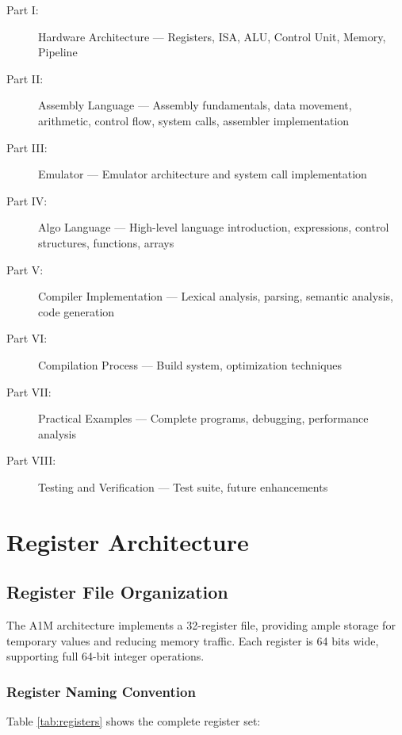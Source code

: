 \documentclass[12pt,a4paper,oneside]{book}
\begin{document}
\begin{description}
    \item[Part I:] Hardware Architecture --- Registers, ISA, ALU, Control Unit, Memory, Pipeline
    \item[Part II:] Assembly Language --- Assembly fundamentals, data movement, arithmetic, control flow, system calls, assembler implementation
    \item[Part III:] Emulator --- Emulator architecture and system call implementation
    \item[Part IV:] Algo Language --- High-level language introduction, expressions, control structures, functions, arrays
    \item[Part V:] Compiler Implementation --- Lexical analysis, parsing, semantic analysis, code generation
    \item[Part VI:] Compilation Process --- Build system, optimization techniques
    \item[Part VII:] Practical Examples --- Complete programs, debugging, performance analysis
    \item[Part VIII:] Testing and Verification --- Test suite, future enhancements
\end{description}

\chapter{Register Architecture}

\section{Register File Organization}

The A1M architecture implements a 32-register file, providing ample storage for temporary values and reducing memory traffic. Each register is 64 bits wide, supporting full 64-bit integer operations.

\subsection{Register Naming Convention}

Table \ref{tab:registers} shows the complete register set:
\end{document}

